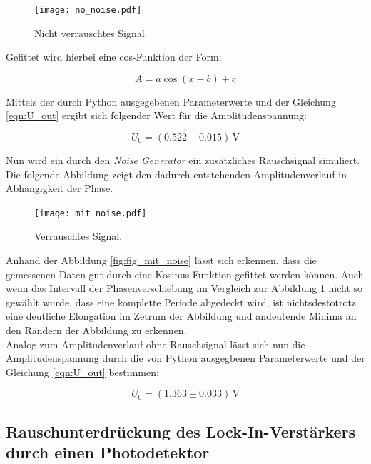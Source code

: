 \begin{figure}[H]
    \texttt{[image: no\_noise.pdf]}
    \caption{Nicht verrauschtes Signal.}
    \label{fig:fit_no_noise}
\end{figure}

\noindent
Gefittet wird hierbei eine cos-Funktion der Form:

\begin{equation*}
    A = a\cos(x - b) + c
\end{equation*}

\noindent Mittels der durch Python ausgegebenen Parameterwerte und der Gleichung \eqref{eqn:U_out} ergibt sich folgender Wert 
für die Amplitudenspannung:

\begin{equation*}
    U_0 = (0.522 \pm 0.015)\,\unit{\volt}
\end{equation*}

\noindent Nun wird ein durch den \emph{Noise Generator} ein zusätzliches Rauschsignal simuliert. Die folgende Abbildung zeigt den
dadurch entstehenden Amplitudenverlauf in Abhängigkeit der Phase.

\begin{figure}[H]
    \texttt{[image: mit\_noise.pdf]}
    \caption{Verrauschtes Signal.}
    \label{fig:fit_mit_noise}
\end{figure}

\noindent
Anhand der Abbildung \ref{fig:fig_mit_noise} lässt sich erkennen, dass die gemessenen Daten gut durch eine Kosinus-Funktion gefittet werden 
können. Auch wenn das Intervall der Phasenverschiebung im Vergleich zur Abbildung \ref{fig:fit_no_noise} nicht so gewählt 
wurde, dass eine komplette Periode abgedeckt wird, ist nichtsdestotrotz eine deutliche Elongation im Zetrum der Abbildung und 
andeutende Minima an den Rändern der Abbildung zu erkennen.\\
Analog zum Amplitudenverlauf ohne Rauschsignal lässt sich nun die Amplitudenspannung durch die von Python ausgegbenen Parameterwerte
und der Gleichung \eqref{eqn:U_out} bestimmen:

\begin{equation*}
    U_0 = (1.363 \pm 0.033)\,\unit{\volt}
\end{equation*}

\subsection{Rauschunterdrückung des Lock-In-Verstärkers durch einen Photodetektor}

